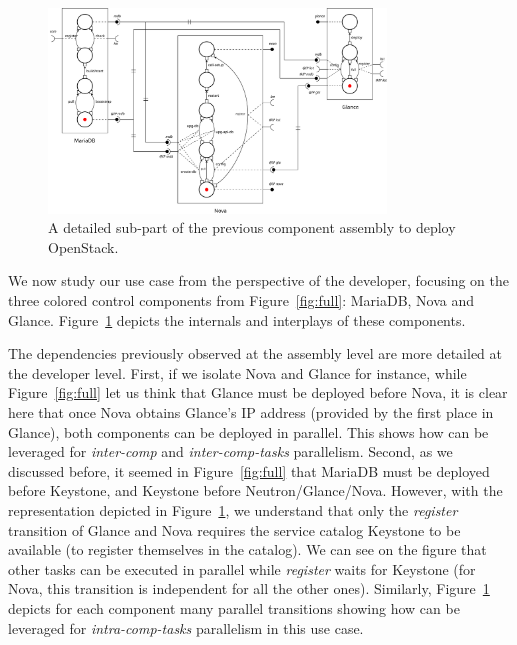 \begin{figure}[t]
  \begin{center}
    \includegraphics[width=0.8\textwidth]{./images/sub2.pdf}
    \caption{A detailed sub-part of the previous component assembly to deploy
    OpenStack.}
    \label{fig:sub}
  \end{center}
\end{figure}

We now study our use case from the perspective of the developer, focusing on the three colored control components from Figure~\ref{fig:full}: MariaDB, Nova and Glance. Figure~\ref{fig:sub} depicts the internals and interplays of these components.

The dependencies previously observed at the assembly level are more
detailed at the developer level. First, if we isolate Nova and Glance
for instance, while Figure~\ref{fig:full} let us think that Glance
must be deployed before Nova, it is clear here that once Nova obtains
Glance's IP address (provided by the first place in Glance), both
components can be deployed in parallel. This shows how \mad can be
leveraged for \emph{inter-comp} and \emph{inter-comp-tasks}
parallelism.  Second, as we discussed before, it seemed in
Figure~\ref{fig:full} that MariaDB must be deployed before Keystone,
and Keystone before Neutron/Glance/Nova. However, with the \mad
representation depicted in Figure~\ref{fig:sub}, we understand that
only the \emph{register} transition of Glance and Nova requires the
service catalog Keystone to be available (\ie to register themselves
in the catalog). We can see on the figure that other tasks can be
executed in parallel while \emph{register} waits for Keystone (\eg for
Nova, this transition is independent for all the other
ones). Similarly, Figure~\ref{fig:sub} depicts for each component many
parallel transitions showing how \mad can be leveraged for
\emph{intra-comp-tasks} parallelism in this use case.

